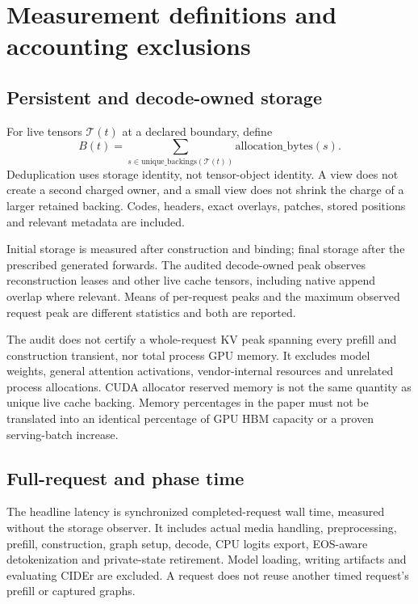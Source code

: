 \documentclass{article}
\begin{document}
\section{Measurement definitions and accounting exclusions}
\subsection{Persistent and decode-owned storage}
For live tensors $\mathcal T(t)$ at a declared boundary, define
\begin{equation}
 B(t)=\sum_{s\in\mathrm{unique\_backings}(\mathcal T(t))}
       \mathrm{allocation\_bytes}(s).
\end{equation}
Deduplication uses storage identity, not tensor-object identity. A view
does not create a second charged owner, and a small view does not shrink
the charge of a larger retained backing. Codes, headers, exact overlays,
patches, stored positions and relevant metadata are included.

Initial storage is measured after construction and binding; final storage
after the prescribed generated forwards. The audited decode-owned peak
observes reconstruction leases and other live cache tensors, including
native append overlap where relevant. Means of per-request peaks and the
maximum observed request peak are different statistics and both are
reported.

The audit does not certify a whole-request KV peak spanning every prefill
and construction transient, nor total process GPU memory. It excludes
model weights, general attention activations, vendor-internal resources
and unrelated process allocations. CUDA allocator reserved memory is not
the same quantity as unique live cache backing. Memory percentages in
the paper must not be translated into an identical percentage of GPU HBM
capacity or a proven serving-batch increase.

\begin{table}[t]
\centering\small
\caption{Reduction of \Evi{} relative to each measured operating point.
All percentages are computed from measured cohort means. These are
different-byte comparisons, not matched-budget or equal-quality results.}
\label{tab:reductions}
\end{table}

\subsection{Full-request and phase time}
The headline latency is synchronized completed-request wall time, measured
without the storage observer. It includes actual media handling,
preprocessing, prefill, construction, graph setup, decode, CPU logits
export, EOS-aware detokenization and private-state retirement. Model
loading, writing artifacts and evaluating CIDEr are excluded. A request
does not reuse another timed request's prefill or captured graphs.
\end{document}
